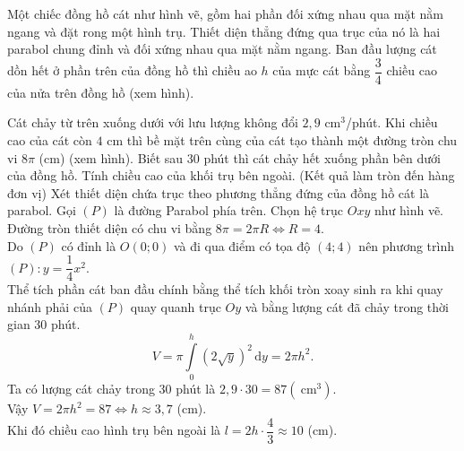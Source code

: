 \begin{ex}%
Một chiếc đồng hồ cát như hình vẽ, gồm hai phần đối xứng nhau qua mặt nằm ngang và đặt rong một hình trụ. Thiết diện thẳng đứng qua trục của nó là hai parabol chung đỉnh và đối xứng nhau qua mặt nằm ngang. Ban đầu lượng cát dồn hết ở phần trên của đồng hồ thì chiều ao $h$ của mực cát bằng $\dfrac{3}{4}$ chiều cao của nửa trên đồng hồ (xem hình).




Cát chảy từ trên xuống dưới với lưu lượng không đổi $2{,}9$ cm$^3$/phút. Khi chiều cao của cát còn $4$ cm thì bề mặt trên cùng của cát tạo thành một đường tròn chu vi $8 \pi$ (cm) (xem hình). Biết sau $30$ phút thì cát chảy hết xuống phần bên dưới của đồng hồ. Tính chiều cao của khối trụ bên ngoài. (Kết quả làm tròn đến hàng đơn vị)
\shortans{}
\loigiai
{Xét thiết diện chứa trục theo phương thẳng đứng của đồng hồ cát là parabol. Gọi $(P)$ là đường Parabol phía trên. Chọn hệ trục $O x y$ như hình vẽ.\\
Đường tròn thiết diện có chu vi bằng $8 \pi=2 \pi R \Leftrightarrow R=4$.\\
Do $(P)$ có đỉnh là $O(0 ; 0)$ và đi qua điểm có tọa độ $(4 ; 4)$ nên phương trình $(P)\colon y=\dfrac{1}{4} x^2$.\\
Thể tích phần cát ban đầu chính bằng thể tích khối tròn xoay sinh ra khi quay nhánh phải của $(P)$ quay quanh trục $O y$ và bằng lượng cát đã chảy trong thời gian $30$ phút.
\[
V=\pi \displaystyle\int\limits_0^h(2 \sqrt{y})^2 \mathrm{\,d} y=2 \pi h^2.		\]
Ta có lượng cát chảy trong 30 phút là $2{,}9\cdot30=87\left(\mathrm{~cm}^3\right)$.\\
Vậy $V=2 \pi h^2=87 \Leftrightarrow h \approx 3{,}7$ (cm).\\
Khi đó chiều cao hình trụ bên ngoài là $l=2 h \cdot \dfrac{4}{3} \approx 10$ (cm).
}
\end{ex}

